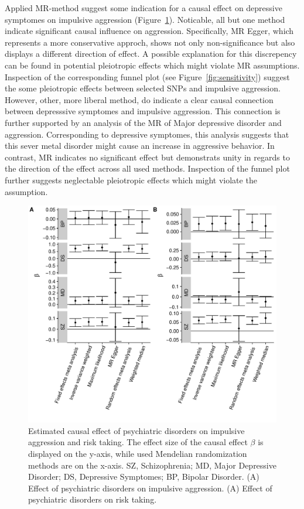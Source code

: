 Applied MR-method suggest some indication for a causal effect on depressive symptomes on impulsive aggression (Figure~\ref{fig:overall_mr_effect}).
Noticable, all but one method indicate significant causal influence on aggression. 
Specifically, MR Egger, which represents a more conservative approch, shows not only non-significance but also displays a different direction of effect.
A possible explanation for this discrepency can be found in potential pleiotropic effects which might violate MR assumptions.
Inspection of the corresponding funnel plot (see Figure~\ref{fig:sensitivity}) suggest the some pleiotropic effects between selected SNPs and impulsive aggression.
However, other, more liberal method, do indicate a clear causal connection between depresssive symptomes and impulsive aggression.
This connection is further supported by an analysis of the MR of Major depressive disorder and aggression.
Corresponding to depressive symptomes, this analysis suggests that this sever metal disorder might cause an increase in aggressive behavior. 
In contrast, MR indicates no significant effect but demonstrats unity in regards to the direction of the effect across all used methods.
Inspection of the funnel plot further suggests neglectable pleiotropic effects which might violate the assumption.

\begin{figure}[htpb]
  \centering
  \includegraphics[width=0.9\linewidth]{figures/overall_mr_effect.pdf}
  \caption{Estimated causal effect of psychiatric disorders on impulsive aggression and risk taking.
    The effect size of the causal effect $\beta$ is displayed on the y-axis, while used Mendelian randomization methods are on the x-axis.
    SZ, Schizophrenia; MD, Major Depressive Disorder; DS, Depressive Symptomes; BP, Bipolar Disorder.
    (A) Effect of psychiatric disorders on impulsive aggression.
    (A) Effect of psychiatric disorders on risk taking.
  }\label{fig:overall_mr_effect}
\end{figure}

